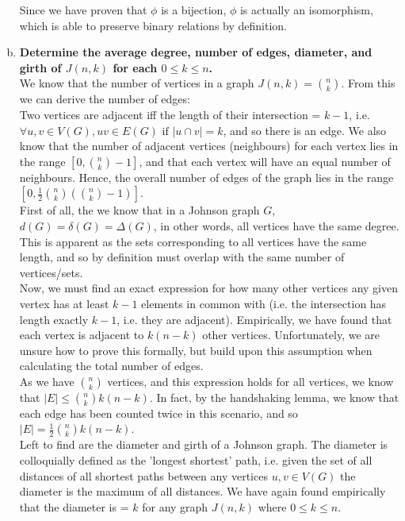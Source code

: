 \begin{enumerate}[a)]
    \linebreak
    Since we have proven that $\phi$ is a bijection, $\phi$ is actually an isomorphism, which is able to preserve binary relations by definition.
    \boldmath
    \item \textbf{Determine the average degree, number of edges, diameter, and girth of $J(n, k)$ for each
$0 \leq k \leq n$.} \\
\linebreak 
\unboldmath
We know that the number of vertices in a graph $J(n,k) = \binom{n}{k}$. From this we can derive the number of edges: \\
\linebreak 
Two vertices are adjacent iff the length of their intersection = $k-1$, i.e. $\forall u,v \in V(G), uv \in E(G) \text{ if } |u \cap v| = k$, and so there is an edge. We also know that the number of adjacent vertices (neighbours) for each vertex lies in the range $[0, \binom{n}{k}-1]$, and that each vertex will have an equal number of neighbours. Hence, the overall number of edges of the graph lies in the range $[0, \frac{1}{2}\binom{n}{k}(\binom{n}{k}-1)]$.\\  
\linebreak 
First of all, the we know that in a Johnson graph $G$, $d(G) = \delta(G) =\Delta(G)$, in other words, all vertices have the same degree. This is apparent as the sets corresponding to all vertices have the same length, and so by definition must overlap with the same number of vertices/sets. \\
\linebreak 
Now, we must find an exact expression for how many other vertices any given vertex has at least $k-1$ elements in common with (i.e. the intersection has length exactly $k-1$, i.e. they are adjacent). Empirically, we have found that each vertex is adjacent to $k(n-k)$ other vertices. Unfortunately, we are unsure how to prove this formally, but build upon this assumption when calculating the total number of edges.  \\
\linebreak 
As we have $\binom{n}{k}$ vertices, and this expression holds for all vertices, we know that $|E| \leq \binom{n}{k}k(n-k)$. In fact, by the handshaking lemma, we know that each edge has been counted twice in this scenario, and so $|E| = \frac{1}{2}\binom{n}{k}k(n-k)$. \\
\linebreak 
Left to find are the diameter and girth of a Johnson graph. The diameter is colloquially defined as the 'longest shortest' path, i.e. given the set of all distances of all shortest paths between any vertices $u, v \in V(G)$ the diameter is the maximum of all distances. We have again found empirically that the diameter is = $k$ for any graph $J(n, k)$ where $0 \leq k \leq n$. \\

\end{enumerate}
